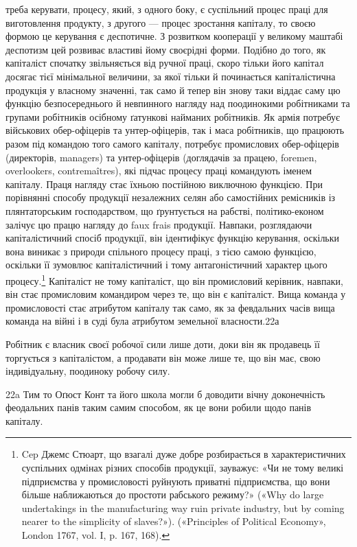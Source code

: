 треба керувати, процесу, який, з одного боку, є суспільний процес
праці для виготовлення продукту, з другого — процес зростання
капіталу, то своєю формою це керування є деспотичне. З розвитком
кооперації у великому маштабі деспотизм цей розвиває властиві
йому своєрідні форми. Подібно до того, як капіталіст спочатку
звільняється від ручної праці, скоро тільки його капітал
досягає тієї мінімальної величини, за якої тільки й починається
капіталістична продукція у власному значенні, так само й тепер
він знову таки віддає саму цю функцію безпосереднього й невпинного
нагляду над поодинокими робітниками та групами робітників
осібному ґатункові найманих робітників. Як армія потребує
військових обер-офіцерів та унтер-офіцерів, так і маса робітників,
що працюють разом під командою того самого капіталу,
потребує промислових обер-офіцерів (директорів, managers)
та унтер-офіцерів (доглядачів за працею, foremen, overlookers,
contremaîtres), які підчас процесу праці командують іменем
капіталу. Праця нагляду стає їхньою постійною виключною
функцією. При порівнянні способу продукції незалежних селян
або самостійних ремісників із плянтаторським господарством,
що ґрунтується на рабстві, політико-економ залічує цю працю
нагляду до faux frais продукції. Навпаки, розглядаючи капіталістичний
спосіб продукції, він ідентифікує функцію керування,
оскільки вона виникає з природи спільного процесу праці, з
тією самою функцією, оскільки її зумовлює капіталістичний і
тому антагоністичний характер цього процесу.\footnote{
Cep Джемс Стюарт, що взагалі дуже добре розбирається в характеристичних
суспільних одмінах різних способів продукції, зауважує:
«Чи не тому великі підприємства у промисловості руйнують приватні
підприємства, що вони більше наближаються до простоти рабського режиму?»
(«Why do large undertakings in the manufacturing way ruin private
industry, but by coming nearer to the simplicity of slaves?»). («Principles
of Political Economy», London 1767, vol. I, p. 167, 168).
} Капіталіст не
тому капіталіст, що він промисловий керівник, навпаки, він стає
промисловим командиром через те, що він є капіталіст. Вища
команда у промисловості стає атрибутом капіталу так само, як
за февдальних часів вища команда на війні і в суді була атрибутом
земельної власности.22а

Робітник є власник своєї робочої сили лише доти, доки він
як продавець її торгується з капіталістом, а продавати він може
лише те, що він має, свою індивідуальну, поодиноку робочу силу.

22a Тим то Оґюст Конт та його школа могли б доводити вічну доконечність
феодальних панів таким самим способом, як це вони робили
щодо панів капіталу.